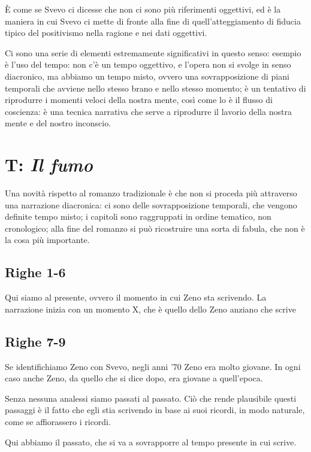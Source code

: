 È come se Svevo ci dicesse che non ci sono più riferimenti oggettivi, ed è la maniera in cui Svevo ci mette di fronte alla fine di quell'atteggiamento di fiducia tipico del positivismo nella ragione e nei dati oggettivi.

Ci sono una serie di elementi estremamente significativi in questo senso: esempio è l'uso del tempo: non c'è un tempo oggettivo, e l'opera non si svolge in senso diacronico, ma abbiamo un tempo misto, ovvero una sovrapposizione di piani temporali che avviene nello stesso brano e nello stesso momento; è un tentativo di riprodurre i momenti veloci della nostra mente, così come lo è il flusso di coscienza: è una tecnica narrativa che serve a riprodurre il lavorio della nostra mente e del nostro inconscio.

\section{T: \textit{Il fumo}}

Una novità rispetto al romanzo tradizionale è che non si proceda più attraverso una narrazione diacronica: ci sono delle sovrapposizione temporali, che vengono definite tempo misto;
i capitoli sono raggruppati in ordine tematico, non cronologico; alla fine del romanzo si può ricostruire una sorta di fabula, che non è la cosa più importante.

\subsection{Righe 1-6}

Qui siamo al presente, ovvero il momento in cui Zeno sta scrivendo. La narrazione inizia con un momento X, che è quello dello Zeno anziano che scrive

\subsection{Righe 7-9}

Se identifichiamo Zeno con Svevo, negli anni '70 Zeno era molto giovane. In ogni caso anche Zeno, da quello che si dice dopo, era giovane a quell'epoca.

Senza nessuna analessi siamo passati al passato. Ciò che rende plausibile questi passaggi è il fatto che egli stia scrivendo in base ai suoi ricordi, in modo naturale, come se affiorassero i ricordi.

Qui abbiamo il passato, che si va a sovrapporre al tempo presente in cui scrive.

